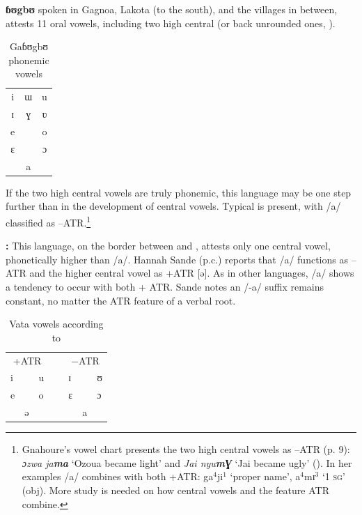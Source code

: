 \documentclass[output=paper,newtxmath,modfonts,nonflat,draft]{langsci/langscibook}
\begin{document}
\textbf{ɓʊgbʊ} spoken in Gagnoa, Lakota (to the south), and the villages in between, attests 11 oral vowels, including two high central (or back unrounded ones, \citealt[5, 9]{Gnahore2006}). 

\begin{table}
	\caption{Gaɓʊgbʊ phonemic vowels}
	\label{tab:zogbo:13}
	\begin{tabular}{ccc}
i  &  ɯ  &   u\\

ɪ    & ɣ &   ʋ\\

e    & &   o\\

ɛ    & &  ɔ\\

	& a\\
	\end{tabular}
\end{table}


If the two high central vowels are truly phonemic, this language may be one step further than  in the development of central vowels. Typical  is present, with /a/ classified as –ATR.\footnote{Gnahoure’s vowel chart presents the two high central vowels as –ATR (p. 9): \textit{ɔzwa ja}\textbf{\textit{ma}} ‘Ozoua became light’ and \textit{Jai nyu}\textbf{\textit{m}}\textbf{\textit{Ɣ}} ‘Jai became ugly’ (\citeyear[25]{Gnahore2006}).  In her examples /a/ combines with both +ATR:  ga$^4$ji$^1$ ‘proper name’, a$^4$mɪ$^3$ ‘1 \textsc{sg}’ (obj).  More study is needed on how central vowels and the feature ATR combine.} 

\textbf{:} This language, on the border between  and , attests only one central vowel, phonetically higher than /a/. Hannah Sande (p.c.) reports that /a/ functions as –ATR and the higher central vowel as +ATR [ə].  As in other  languages, /a/ shows a tendency to occur with both + ATR.  Sande notes an /-a/ suffix remains constant, no matter the ATR feature of a verbal root. 

\begin{table}
\caption{Vata vowels according to \citet{Kaye1980}}	
\label{tab:zogbo:14}
\begin{tabular}{lllllll}
\multicolumn{3}{c}{+ATR} && \multicolumn{3}{c}{−ATR}\\ 
i  &&  u  &~&  ɪ  &&  ʊ\\

e  &&  o  &&  ɛ  &&  ɔ\\

& ə   &&&&     a \\
	\end{tabular}
\end{table}
\end{document}
